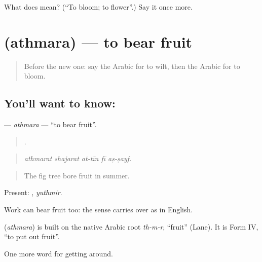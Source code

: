 \begin{tcolorbox}[breakable,colback=teal!4,colframe=teal!35!black,title={Before you move on}]
What does  mean? (\textquotedblleft{}To bloom; to flower\textquotedblright{}.) Say it once more.
\end{tcolorbox}
\section[\texorpdfstring{\ar{أثمر} (athmara)}{أثمر (athmara)}]{ (athmara) — to bear fruit}

\label{lesson:AR-C468-athmara}



\begin{quote}
Before the new one: say the Arabic for to wilt, then the Arabic for to bloom.
\end{quote}

\subsection*{You'll want to know: }
\textbf{} — \emph{athmara} — \textquotedblleft{}to bear fruit\textquotedblright{}.

\begin{quote}
    .
\end{quote}

\begin{quote}
\emph{athmarat shajarat at-tīn fī aṣ-ṣayf.}
\end{quote}

\begin{quote}
The fig tree bore fruit in summer.
\end{quote}

Present: , \emph{yuthmir}.

Work can bear fruit too: the sense carries over as in English.

\begin{cousinweb}
\textbf{} (\emph{athmara}) is built on the native Arabic root \emph{th-m-r}, \textquotedblleft{}fruit\textquotedblright{} (Lane). It is Form IV, \textquotedblleft{}to put out fruit\textquotedblright{}.
\end{cousinweb}

\begin{grammarlens}[title={What you've built}]
One more word for getting around.
\end{grammarlens}

